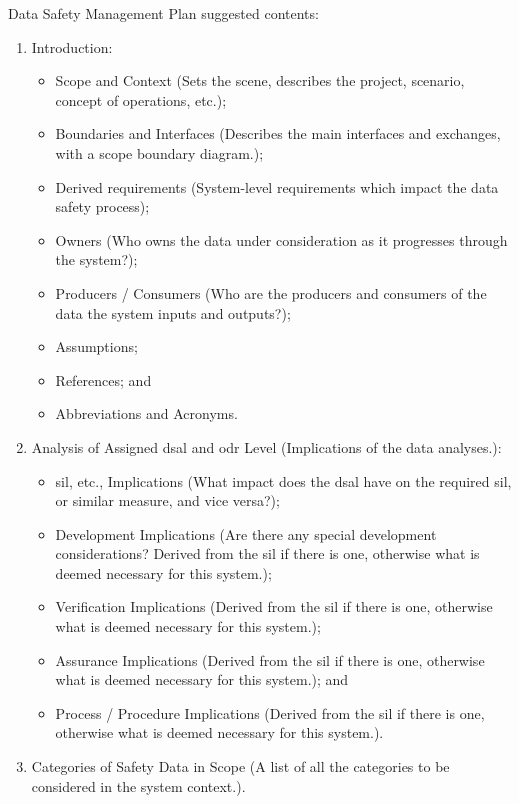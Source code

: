 Data Safety Management Plan suggested contents:
\begin{enumerate}
  \item Introduction:
  \begin{itemize}
    \item Scope and Context (Sets the scene, describes the project, scenario, concept of operations, etc.);
    \item Boundaries and Interfaces (Describes the main interfaces and exchanges, with a scope boundary diagram.);
    \item
      Derived requirements (System-level requirements which impact the data safety process);
    \item {}Owners (Who owns the data under consideration as it progresses through the system?);
    \item Producers / Consumers (Who are the producers and consumers of the data the system inputs and outputs?);
    \item Assumptions;
    \item References; and
    \item Abbreviations and Acronyms.
  \end{itemize}
  \item Analysis of Assigned \gls{dsal} and \gls{odr} Level (Implications of the data analyses.):
  \begin{itemize}
    \item \cbstart\gls{sil}, etc., Implications (What impact does the \gls{dsal} have on the required \gls{sil}, or similar measure, and vice versa?);
    \item Development Implications (Are there any special development considerations? Derived from the \gls{sil} if there is one, otherwise what is deemed necessary for this system.);
    \item Verification Implications (Derived from the \gls{sil} if there is one, otherwise what is deemed necessary for this system.);
    \item Assurance Implications (Derived from the \gls{sil} if there is one, otherwise what is deemed necessary for this system.); and
    \item Process / Procedure Implications (Derived from the \gls{sil} if there is one, otherwise what is deemed necessary for this system.).
  \end{itemize}
\item
  Categories
  of Safety Data in Scope (A list of all the categories to be considered in the system context.).

\end{enumerate}
